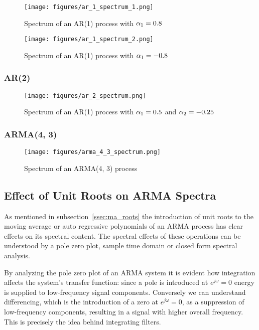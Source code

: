 \begin{figure}[H]
    \centering
    \texttt{[image: figures/ar\_1\_spectrum\_1.png]}
    \caption{Spectrum of an AR(1) process with
    $\protect \alpha_1 = 0.8$}
    \label{fig:ar_1_spectrum_1}
\end{figure}

\begin{figure}[H]
    \centering
    \texttt{[image: figures/ar\_1\_spectrum\_2.png]}
    \caption{Spectrum of an AR(1) process with
    $\protect \alpha_1 = -0.8$}
    \label{fig:ar_1_spectrum_2}
\end{figure}

\subsubsection{AR(2)}

\begin{figure}[H]
    \centering
    \texttt{[image: figures/ar\_2\_spectrum.png]}
    \caption{Spectrum of an AR(1) process with
    $\protect \alpha_1 = 0.5$ and $\protect \alpha_2 = -0.25$}
    \label{fig:ar_2_spectrum}
\end{figure}

\subsubsection{ARMA(4, 3)}

\begin{figure}[H]
    \centering
    \texttt{[image: figures/arma\_4\_3\_spectrum.png]}
    \caption{Spectrum of an ARMA(4, 3) process}
    \label{fig:ar_4_3_spectrum}
\end{figure}


\subsection{Effect of Unit Roots on ARMA Spectra}

As mentioned in subsection~\ref{ssec:ma_roots} the introduction of unit roots
to the moving average or auto regressive polynomials of an ARMA process has
clear effects on its spectral content. The spectral effects of these operations
can be understood by a pole zero plot, sample time domain or closed form
spectral analysis.

By analyzing the pole zero plot of an ARMA system it is evident how integration
affects the system's transfer function: since a pole is introduced at
$e^{j\omega}=0$ energy is supplied to low-frequency signal components.
Conversely we can understand differencing, which is the introduction of a
zero at $e^{j\omega}=0$, as a suppression of low-frequency components,
resulting in a signal with higher overall frequency. This is precisely the
idea behind integrating filters.

